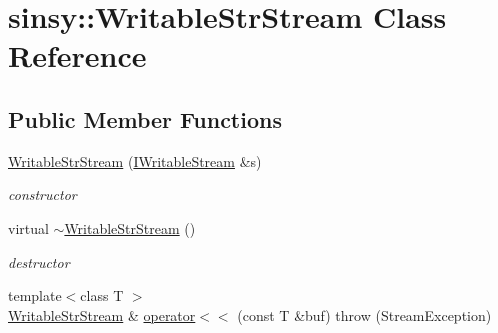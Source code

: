 \hypertarget{classsinsy_1_1WritableStrStream}{\section{sinsy\-:\-:\-Writable\-Str\-Stream \-Class \-Reference}
\label{classsinsy_1_1WritableStrStream}
}
\subsection*{\-Public \-Member \-Functions}
\begin{DoxyCompactItemize}
\item 
\hypertarget{classsinsy_1_1WritableStrStream_a669548a8de107bab0a0c13972569757a}{\hyperlink{classsinsy_1_1WritableStrStream_a669548a8de107bab0a0c13972569757a}{\-Writable\-Str\-Stream} (\hyperlink{classsinsy_1_1IWritableStream}{\-I\-Writable\-Stream} \&s)}\label{classsinsy_1_1WritableStrStream_a669548a8de107bab0a0c13972569757a}

\begin{DoxyCompactList}\small\item\em constructor \end{DoxyCompactList}\item 
\hypertarget{classsinsy_1_1WritableStrStream_a758fd45156c859552c94497889209844}{virtual \hyperlink{classsinsy_1_1WritableStrStream_a758fd45156c859552c94497889209844}{$\sim$\-Writable\-Str\-Stream} ()}\label{classsinsy_1_1WritableStrStream_a758fd45156c859552c94497889209844}

\begin{DoxyCompactList}\small\item\em destructor \end{DoxyCompactList}\item 
{\footnotesize template$<$class T $>$ }\\\hyperlink{classsinsy_1_1WritableStrStream}{\-Writable\-Str\-Stream} \& \hyperlink{classsinsy_1_1WritableStrStream_a64c44dccf4d749780734e35582a75a84}{operator$<$$<$} (const \-T \&buf)  throw (\-Stream\-Exception)
\end{DoxyCompactItemize}


